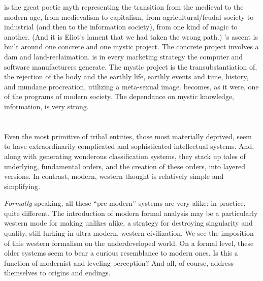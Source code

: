 \documentclass[11pt,twoside,draft]{memoir}
\begin{document}
 is the great poetic myth representing
the transition from the medieval to the modern age, from medievalism to capitalism,
from agricultural\slash feudal society to industrial
(and then to the information society), from
one kind of magic to another. (And it is
Eliot's lament that we had taken the wrong
path.) 's ascent is built around one
concrete and one mystic project. The concrete project involves a dam and land-reclaimation. 
 is in every marketing strategy
the computer and software manufacturers
generate. The mystic project is the transubstantiation of, the rejection of the body and
the earthly life, earthly events and time,
history, and mundane procreation, utilizing
a meta-sexual image. 
becomes, as it were, one of the programs of modern society.
The dependance on mystic knowledge, information, is very strong.

\chapter{}

Even the most primitive of tribal entities,
those most materially deprived, seem to
have extraordinarily complicated and sophisticated intellectual systems. And, along with
generating wonderous classification systems,
they stack up tales of underlying, fundamental orders, and the creation of these orders,
into layered versions. In contrast, modern, western thought is relatively simple and
simplifying. 

\emph{Formally} speaking, all these \enquote{pre-modern}
systems are very alike: in practice, quite different. 
The introduction of modern formal analysis may be a particularly western
mode for making unlikes alike, a strategy for
destroying singularity and quality, still lurking in ultra-modern,
western civilization. We see the imposition of this western 
formalism on the underdeveloped world. On a
formal level, these older systems seem to
bear a curious resemblance to modern ones.
Is this a function of modernist and leveling
perception? And all, of course, address
themselves to origins and endings.
\end{document}
